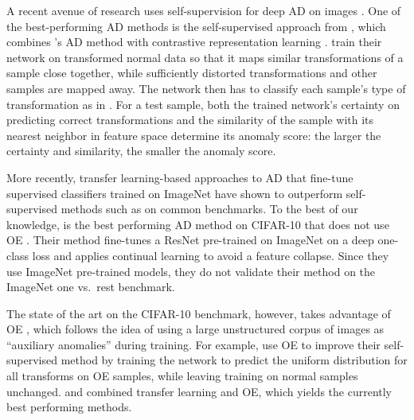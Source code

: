 \documentclass[10pt]{article} \usepackage[accepted]{stylefiles/tmlr}
\begin{document}
A recent avenue of research uses self-supervision for deep AD on images \citep{gidaris2018unsupervised,golan2018deep,mariusnips19,hendrycks2019using,tack2020,sohn2021}. 
One of the best-performing AD methods is the self-supervised approach from \citet{tack2020}, which combines \citet{hendrycks2019using}'s AD method with contrastive representation learning \citep{chen2020simple}.
\citet{tack2020} train their network on transformed normal data so that it maps similar transformations of a sample close together, while sufficiently distorted transformations and other samples are mapped away.
The network then has to classify each sample's type of transformation as in \citep{hendrycks2019using}. 
For a test sample, both the trained network's certainty on predicting correct transformations and the similarity of the sample with its nearest neighbor in feature space determine its anomaly score:
the larger the certainty and similarity, the smaller the anomaly score.

More recently, transfer learning-based approaches to AD \citep{bergman2020deep, reiss2021panda, deecke2021transfer} that fine-tune supervised classifiers trained on ImageNet have shown to outperform self-supervised methods such as \citet{tack2020} on common benchmarks. 
To the best of our knowledge, \citet{reiss2021panda} is the best performing AD method on CIFAR-10 that does not use OE \citep{hendrycks2019deep}.
Their method fine-tunes a ResNet pre-trained on ImageNet on a deep one-class loss \citep{ruff2018deep} and applies continual learning to avoid a feature collapse. 
Since they use ImageNet pre-trained models, they do not validate their method on the ImageNet one vs.~rest benchmark.

The state of the art on the CIFAR-10 benchmark, however, takes advantage of OE \citep{hendrycks2019deep}, which follows the idea of using a large unstructured corpus of images as ``auxiliary anomalies'' during training.
For example, \citet{hendrycks2019using} use OE to improve their self-supervised method by training the network to predict the uniform distribution for all transforms on OE samples, while leaving training on normal samples unchanged. 
\citet{reiss2021panda} and \citet{deecke2021transfer} combined transfer learning and OE, which yields the currently best performing methods.
\end{document}
